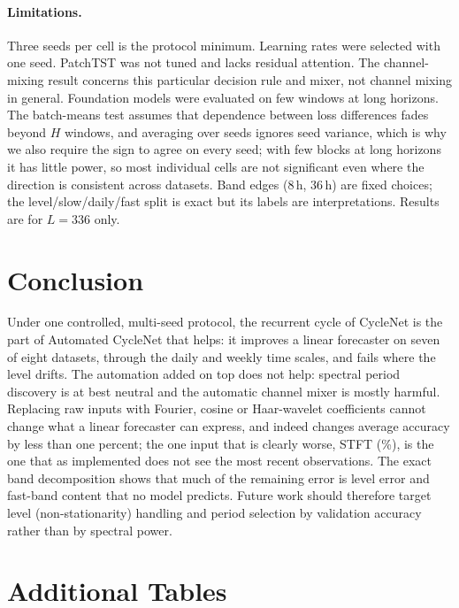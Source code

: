 \documentclass[11pt,a4paper]{article}
\begin{document}
\paragraph{Limitations.}
Three seeds per cell is the protocol minimum. Learning rates were selected with one seed. PatchTST was not tuned and lacks residual attention. The channel-mixing result concerns this particular decision rule and mixer, not channel mixing in general. Foundation models were evaluated on few windows at long horizons. The batch-means test assumes that dependence between loss differences fades beyond $H$ windows, and averaging over seeds ignores seed variance, which is why we also require the sign to agree on every seed; with few blocks at long horizons it has little power, so most individual cells are not significant even where the direction is consistent across datasets. Band edges (8\,h, 36\,h) are fixed choices; the level/slow/daily/fast split is exact but its labels are interpretations. Results are for $L=336$ only.

\section{Conclusion}
\label{sec:conclusion}
Under one controlled, multi-seed protocol, the recurrent cycle of CycleNet is the part of Automated CycleNet that helps: it improves a linear forecaster on seven of eight datasets, through the daily and weekly time scales, and fails where the level drifts. The automation added on top does not help: spectral period discovery is at best neutral and the automatic channel mixer is mostly harmful. Replacing raw inputs with Fourier, cosine or Haar-wavelet coefficients cannot change what a linear forecaster can express, and indeed changes average accuracy by less than one percent; the one input that is clearly worse, STFT (\vTrStftMean\%), is the one that as implemented does not see the most recent observations. The exact band decomposition shows that much of the remaining error is level error and fast-band content that no model predicts. Future work should therefore target level (non-stationarity) handling and period selection by validation accuracy rather than by spectral power.




\appendix

\section{Additional Tables}
\end{document}
